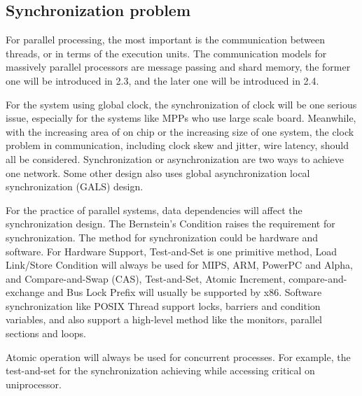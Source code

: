 \subsection{Synchronization problem}
\par For parallel processing, the most important is the communication between threads, or in terms of the execution units. The communication models for massively parallel processors are message passing and shard memory, the former one will be introduced in 2.3, and the later one will be introduced in 2.4. 
\par For the system using global clock, the synchronization of clock will be one serious issue, especially for the systems like MPPs who use large scale board. Meanwhile, with the increasing area of on chip or the increasing size of one system, the clock problem in communication, including clock skew and jitter, wire latency, should all be considered. Synchronization or asynchronization are two ways to achieve one network. Some other design also uses global asynchronization local synchronization (GALS) design\cite{furber2013overview}\cite{hemani1999lowering}. 
\par For the practice of parallel systems, data dependencies will affect the synchronization design. The Bernstein's Condition raises the requirement for synchronization. The method for synchronization could be hardware and software. For Hardware Support, Test-and-Set is one primitive method, Load Link/Store Condition will always be used for MIPS, ARM, PowerPC and Alpha, and Compare-and-Swap (CAS), Test-and-Set, Atomic Increment, compare-and-exchange and Bus Lock Prefix will usually be supported by x86.  Software synchronization like POSIX Thread support locks, barriers and condition variables, and also support a high-level method like the monitors, parallel sections and loops.
\par Atomic operation will always be used for concurrent processes. For example, the test-and-set for the synchronization achieving while accessing critical on uniprocessor.
